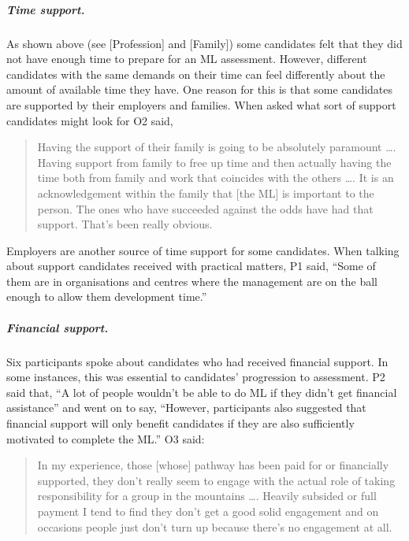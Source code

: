 \documentclass[a4paper,]{book}
\let\oldsubparagraph\subparagraph
\renewcommand{\subparagraph}[1]{\oldsubparagraph{#1}\mbox{}}
\begin{document}
\hypertarget{time-support.}{%
\subparagraph{Time support.}\label{time-support.}}

As shown above (see {[}Profession{]} and {[}Family{]}) some candidates felt that they did not have enough time to prepare for an ML assessment. However, different candidates with the same demands on their time can feel differently about the amount of available time they have. One reason for this is that some candidates are supported by their employers and families. When asked what sort of support candidates might look for O2 said,

\begin{quote}
Having the support of their family is going to be absolutely paramount \ldots{}. Having support from family to free up time and then actually having the time both from family and work that coincides with the others \ldots{}. It is an acknowledgement within the family that {[}the ML{]} is important to the person. The ones who have succeeded against the odds have had that support. That's been really obvious.
\end{quote}

Employers are another source of time support for some candidates. When talking about support candidates received with practical matters, P1 said, ``Some of them are in organisations and centres where the management are on the ball enough to allow them development time.''

\hypertarget{financial-support.}{%
\subparagraph{Financial support.}\label{financial-support.}}

Six participants spoke about candidates who had received financial support. In some instances, this was essential to candidates' progression to assessment. P2 said that, ``A lot of people wouldn't be able to do ML if they didn't get financial assistance'' and went on to say, ``However, participants also suggested that financial support will only benefit candidates if they are also sufficiently motivated to complete the ML.'' O3 said:

\begin{quote}
In my experience, those {[}whose{]} pathway has been paid for or financially supported, they don't really seem to engage with the actual role of taking responsibility for a group in the mountains \ldots{}. Heavily subsided or full payment I tend to find they don't get a good solid engagement and on occasions people just don't turn up because there's no engagement at all.
\end{quote}
\end{document}
